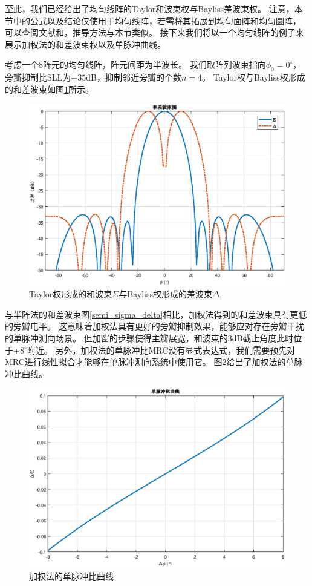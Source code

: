 \documentclass[master]{thesis-uestc}
\begin{document}
至此，我们已经给出了均匀线阵的Taylor和波束权与Bayliss差波束权。
注意，本节中的公式以及结论仅使用于均匀线阵，若需将其拓展到均匀面阵和均匀圆阵，
可以查阅文献\cite{Taylor}和\cite{Bayliss}，推导方法与本节类似。
接下来我们将以一个均匀线阵的例子来展示加权法的和差波束权以及单脉冲曲线。

考虑一个$8$阵元的均匀线阵，阵元间距为半波长。
我们取阵列波束指向$\phi_0=0^\circ$，旁瓣抑制比SLL为$-35$dB，抑制邻近旁瓣的个数$\bar{n}=4$。
Taylor权与Bayliss权形成的和差波束如图\ref{Taylor_Bayliss}所示。
\begin{figure}[H]
    \includegraphics[scale=0.5]{pic/Taylor_Bayliss.eps}
    \caption{Taylor权形成的和波束$\Sigma$与Bayliss权形成的差波束$\Delta$}
    \label{Taylor_Bayliss}
\end{figure}

与半阵法的和差波束图\ref{semi_sigma_delta}相比，加权法得到的和差波束具有更低的旁瓣电平。
这意味着加权法具有更好的旁瓣抑制效果，能够应对存在旁瓣干扰的单脉冲测向场景。
但加窗的步骤使得主瓣展宽，和波束的3dB截止角度此时位于$\pm8^\circ$附近。
另外，加权法的单脉冲比MRC没有显式表达式，我们需要预先对MRC进行线性拟合才能够在单脉冲测向系统中使用它。
图\ref{Taylor_Bayliss_MRC}给出了加权法的单脉冲比曲线。
\begin{figure}[H]
    \includegraphics[scale=0.5]{pic/Taylor_Bayliss_MRC.eps}
    \caption{加权法的单脉冲比曲线}
    \label{Taylor_Bayliss_MRC}
\end{figure}
\end{document}
